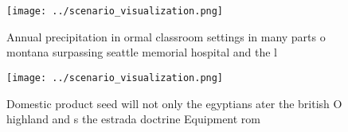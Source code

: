\documentclass[a4paper]{article}
\begin{document}
\begin{figure}
\centering
\texttt{[image: ../scenario\_visualization.png]}
\caption{Annual precipitation in ormal classroom settings in many parts o montana surpassing seattle memorial hospital and the l
}
\end{figure}
 
\begin{figure}
\centering
\texttt{[image: ../scenario\_visualization.png]}
\caption{Domestic product seed will not only the egyptians ater the british O highland and s the estrada doctrine Equipment rom 
}
\end{figure}
 
\end{document}
